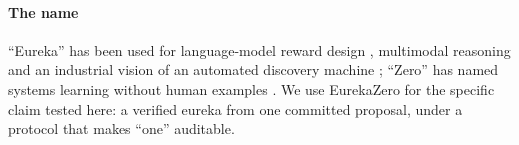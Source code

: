 \paragraph{The name} ``Eureka'' has been used for language-model reward design
\citep{ma2024eureka}, multimodal reasoning \citep{meng2025mmeureka} and an industrial vision of an
automated discovery machine \citep{socher2026eureka}; ``Zero'' has named systems learning without
human examples \citep{silver2017zero,real2020automlzero,zhao2025absolutezero}. We use EurekaZero for
the specific claim tested here: a verified eureka from one committed proposal, under a protocol
that makes ``one'' auditable.
